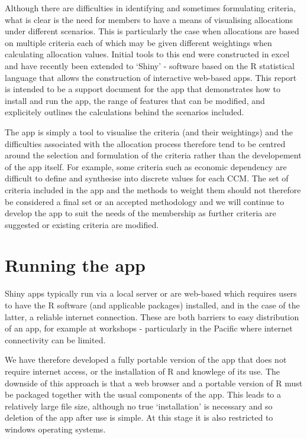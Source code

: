 \documentclass[11pt]{article}
\begin{document}
Although there are difficulties in identifying and sometimes formulating criteria, what is clear is the need for members to have a means of visualising allocations under different scenarios. This is particularly the case when allocations are based on multiple criteria each of which may be given different weightings when calculating allocation values. Initial tools to this end were constructed in excel and have recently been extended to `Shiny' - software based on the R statistical language that allows the construction of interactive web-based apps. This report is intended to be a support document for the app that demonstrates how to install and run the app, the range of features that can be modified, and explicitely outlines the calculations behind the scenarios included.

The app is simply a tool to visualise the criteria (and their weightings) and the difficulties associated with the allocation process therefore tend to be centred around the selection and formulation of the criteria rather than the developement of the app itself. For example, some criteria such as economic dependency are difficult to define and synthesise into discrete values for each CCM. The set of criteria included in the app and the methods to weight them should not therefore be considered a final set or an accepted methodology and we will continue to develop the app to suit the needs of the membership as further criteria are suggested or existing criteria are modified.



\section{Running the app}
Shiny apps typically run via a local server or are web-based which requires users to have the R software (and applicable packages) installed, and in the case of the latter, a reliable internet connection. These are both barriers to easy distribution of an app, for example at workshops - particularly in the Pacific where internet connectivity can be limited.

We have therefore developed a fully portable version of the app that does not require internet access, or the installation of R and knowlege of its use. The downside of this approach is that a web browser and a portable version of R must be packaged together with the usual components of the app. This leads to a relatively large file size, although  no true `installation' is necessary and so deletion of the app after use is simple. At this stage it is also restricted to windows operating systems. 
\end{document}
